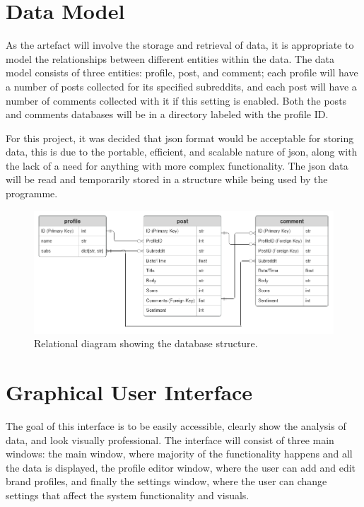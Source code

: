 \section{Data Model}
As the artefact will involve the storage and retrieval of data, it is appropriate to model the relationships between different entities within the data. The data model consists of three entities: profile, post, and comment; each profile will have a number of posts collected for its specified subreddits, and each post will have a number of comments collected with it if this setting is enabled. Both the posts and comments databases will be in a directory labeled with the profile ID.

For this project, it was decided that json format would be acceptable for storing data, this is due to the portable, efficient, and scalable nature of json, along with the lack of a need for anything with more complex functionality. The json data will be read and temporarily stored in a  structure while being used by the programme.

\begin{figure}[h]
    \centering
    \includegraphics[width=\textwidth]{figures/database-relationship-diagram.png}
    \caption{Relational diagram showing the database structure.}
\end{figure}

\section{Graphical User Interface}
The goal of this interface is to be easily accessible, clearly show the analysis of data, and look visually professional. The interface will consist of three main windows: the main window, where majority of the functionality happens and all the data is displayed, the profile editor window, where the user can add and edit brand profiles, and finally the settings window, where the user can change settings that affect the system functionality and visuals.

